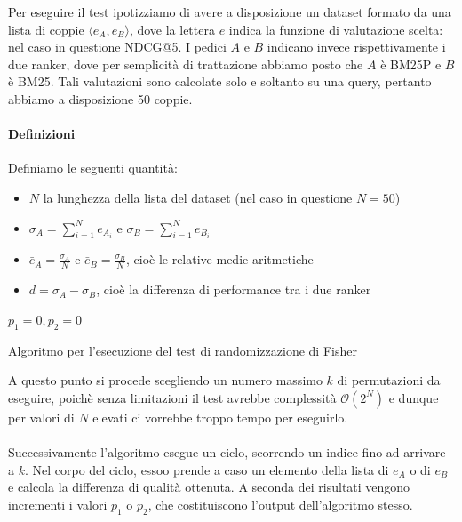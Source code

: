 Per eseguire il test ipotizziamo di avere a disposizione un dataset formato da una lista
di coppie $\langle e_{A}, e_{B}\rangle$, dove la lettera $e$ indica la funzione di valutazione
scelta: nel caso in questione NDCG@5. I pedici $A$ e $B$ indicano invece rispettivamente i due
ranker, dove per semplicità di trattazione abbiamo posto che $A$ è BM25P e $B$ è BM25. Tali valutazioni sono calcolate solo e soltanto su una query,
pertanto abbiamo a disposizione 50 coppie.

\paragraph{Definizioni}
Definiamo le seguenti quantità:

\begin{itemize}
	\item $N$ la lunghezza della lista del dataset (nel caso in questione $N=50$)
	\item $\sigma_A = \sum_{i=1}^{N} e_{A_i}$ e $\sigma_B = \sum_{i=1}^{N} e_{B_i}$
	\item $\bar{e}_A = \frac{\sigma_{A} }{N}$ e  $\bar{e}_B = \frac{\sigma_{B} }{N}$, cioè le relative medie aritmetiche
	\item $d = \sigma_{A} - \sigma_{B}$, cioè la differenza di performance tra i due ranker
\end{itemize}


\begin{algorithm}[h!]
	\small
	\DontPrintSemicolon
	\BlankLine
	$p_1 = 0, p_2 = 0$\;
	\BlankLine
	
	\label{alg:spectest}
	\caption{Algoritmo per l'esecuzione del test di randomizzazione di Fisher}
\end{algorithm}

A questo punto si procede scegliendo un numero massimo $k$ di permutazioni
da eseguire, poichè  senza limitazioni  il test avrebbe complessità $\mathcal{O}(2^N)$
e dunque per valori di $N$ elevati ci vorrebbe troppo tempo per eseguirlo.
\\
\\
Successivamente l'algoritmo esegue un ciclo, scorrendo un indice fino ad arrivare a $k$.
Nel corpo del ciclo, essoo prende a caso un elemento della lista di $e_A$ o di $e_B$ e
calcola la differenza di qualità ottenuta.
A seconda dei risultati vengono incrementi i valori $p_1$ o $p_2$, che costituiscono
l'output dell'algoritmo stesso.


